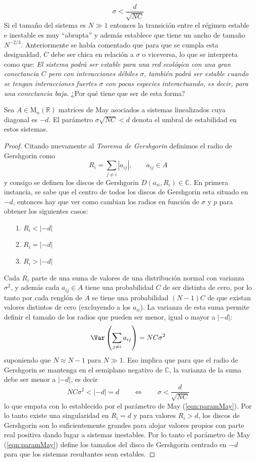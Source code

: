 $$\sigma<\frac{d}{\sqrt{NC}}$$
Si el tamaño del sistema es $N\gg 1$ entonces la transición entre el régimen estable e inestable es muy ``abrupta'' y además establece que tiene un ancho de tamaño $N^{-2/3}$. Anteriormente se había comentado que para que se cumpla esta desigualdad, $C$ debe ser chica en relación a $\sigma$ o viceversa, lo que se interpreta como que: \textit{El sistema podrá ser estable para una red ecológica con una gran conectancia $C$ pero con interacciones débiles $\sigma$, también podrá ser estable cuando se tengan interacciones fuertes $\sigma$ con pocas especies interactuando, es decir, para una conectancia baja.} ¿Por qué tiene que ser de esta forma?
\begin{proposición}\label{prop:paramMay}
	Sea $A\in\mathrm{M}_n(\mathbb{R})$ matrices de May asociados a sistemas linealizados cuya diagonal es $-d$. El parámetro $\sigma\sqrt{NC}<d$ denota el umbral de estabilidad en estos sistemas.
	\begin{proof}
		Citando nuevamente al \textit{Teorema de Gershgorin} \cite{GershgorinTheorem} definimos el radio de Gershgorin como
		$$R_i=\sum_{j\neq i}|a_{ij}|,\qquad a_{ij}\in A$$
		y consigo se definen los discos de Gershgorin $D(a_{ii},R_i)\in\mathbb{C}$. En primera instancia, se sabe que el centro de todos los discos de Gershgorin esta situado en $-d$, entonces hay que ver como cambian los radios en función de $\sigma$ y $p$ para obtener los siguientes casos:
		\begin{itemize}
			\item [1.] $R_i<|-d|$
			\item [2.] $R_i=|-d|$
			\item [3.] $R_i>|-d|$
		\end{itemize}
		Cada $R_i$ parte de una suma de valores de una distribución normal con varianza $\sigma^2$, y además cada $a_{ij}\in A$ tiene una probabilidad $C$ de ser distinta de cero, por lo tanto por cada renglón de $A$ se tiene una probabilidad $(N-1)C$ de que existan valores distintos de cero (excluyendo a los $a_{ii}$). La varianza de esta suma permite definir el tamaño de los radios que pueden ser menor, igual o mayor a $|-d|$:
		\begin{equation}\label{proof2:Varianza}
			\Var\left (\sum_{j\neq i}a_{ij}\right )=NC\sigma^2
		\end{equation}
		suponiendo que $N\approx N-1$ para $N\gg 1$. Eso implica que para que el radio de Gershgorin se mantenga en el semiplano negativo de $\mathbb{C}$, la varianza de la suma debe ser menor a $|-d|$, es decir
		\begin{equation}\label{eqn:estabilidadMay}
			NC\sigma^2<|-d|=d\qquad\Longleftrightarrow\qquad \sigma<\frac{d}{\sqrt{NC}}
		\end{equation}
		lo que empata con lo establecido por el parámetro de May (\ref{eqn:paramMay}). Por lo tanto existe una singularidad en $R_i=d$ y para valores $R_i>d$, los discos de Gershgorin son lo suficientemente grandes para alojar valores propios con parte real positiva dando lugar a sistemas inestables. Por lo tanto el parámetro de May (\ref{eqn:paramMay}) define los tamaños del disco de Gershgorin centrado en $-d$ para que los sistemas resultantes sean estables.
	\end{proof}
\end{proposición}
